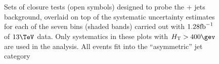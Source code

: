 \begin{figure}[h!]
  \begin{center}
     ~~
     \\
     ~~
     \\
    \caption{Sets of closure tests (open symbols) designed to probe
      the \znunu + jets background, overlaid on top of
      the systematic uncertainty estimates for each of the seven
      \scalht bins (shaded bands) carried out with $1.28\text{fb}^{-1}$ of
      $13\tev$ data. Only systematics in these plots with
      $\scalht>400\gev$ are used in the analysis. All events fit 
      into the ``asymmetric'' jet
      category}
    \label{fig:ZinvclosureDataSymgt400}
  \end{center} 
\end{figure}



